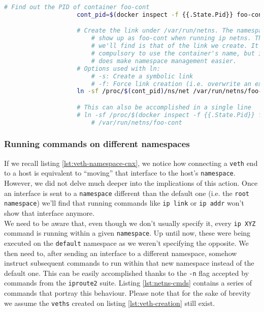                 \begin{lstlisting}[language = bash, caption = Linking a container's network namespace to \texttt{/var/run/netns}., label = lst:ns-link]
                    # Find out the PID of container foo-cont
                    cont_pid=$(docker inspect -f {{.State.Pid}} foo-cont)

                    # Create the link under /var/run/netns. The namespace will
                        # show up as foo-cont when running ip netns. The name
                        # we'll find is that of the link we create. It is NOT
                        # compulsory to use the container's name, but it
                        # does make namespace management easier.
                    # Options used with ln:
                        # -s: Create a symbolic link
                        # -f: Force link creation (i.e. overwrite an existing link)
                    ln -sf /proc/$(cont_pid)/ns/net /var/run/netns/foo-cont

                    # This can also be accomplished in a single line
                    # ln -sf /proc/$(docker inspect -f {{.State.Pid}} foo-cont)/ns/net\ 
                        # /var/run/netns/foo-cont
                \end{lstlisting}

            \subsubsection{Running commands on different namespaces}
                If we recall listing \ref{lst:veth-namespace-cnx}, we notice how connecting a \texttt{veth} end to a host is equivalent to ``moving'' that interface to the host's \texttt{namespace}. However, we did not delve much deeper into the implications of this action. Once an interface is sent to a \texttt{namespace} different than the default one (i.e. the \texttt{root namespace}) we'll find that running commands like \texttt{ip link} or \texttt{ip addr} won't show that interface anymore.\\

                We need to be aware that, even though we don't usually specify it, every \texttt{ip XYZ} command is running within a given \texttt{namespace}. Up until now, these were being executed on the \texttt{default} namespace as we weren't specifying the opposite. We then need to, after sending an interface to a different namespace, somehow instruct subsequent commands to run within that new namespace instead of the default one. This can be easily accomplished thanks to the \texttt{-n} flag accepted by commands from the \texttt{iproute2} suite. Listing \ref{lst:netns-cmds} contains a series of commands that portray this behaviour. Please note that for the sake of brevity we assume the \texttt{veths} created on listing \ref{lst:veth-creation} still exist.\\


